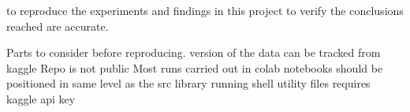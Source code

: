 to reproduce the experiments and findings in this project to verify the conclusions reached are accurate.

Parts to consider before reproducing.
version of the data can be tracked from kaggle
Repo is not public
Most runs carried out in colab 
notebooks should be positioned in same level as the src library
running shell utility files requires kaggle api key


\clearpage
